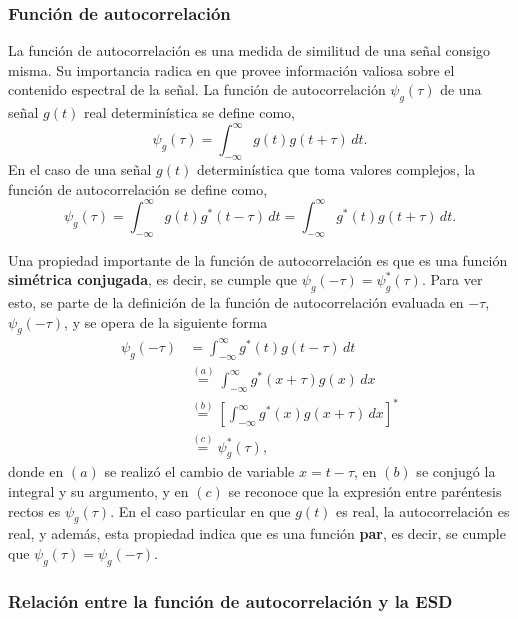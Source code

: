 \documentclass[a4paper]{article}
\begin{document}
\subsubsection{Función de autocorrelación}\label{sec:energy_signal_autocorr}

La función de autocorrelación es una medida de similitud de una señal consigo misma. Su importancia radica en que provee información valiosa sobre el contenido espectral de la señal. La función de autocorrelación \(\psi_g(\tau)\) de una señal \(g(t)\) real determinística se define como,
\begin{equation}\label{eq:deterministic_autocorr_def}
 \psi_g(\tau)=\int_{-\infty}^{\infty}g(t)g(t+\tau)\,dt.
\end{equation}
En el caso de una señal \(g(t)\) determinística que toma valores complejos, la función de autocorrelación se define como,
\[
 \psi_g(\tau)=\int_{-\infty}^{\infty}g(t)g^*(t-\tau)\,dt = \int_{-\infty}^{\infty}g^*(t)g(t+\tau)\,dt.
\]

Una propiedad importante de la función de autocorrelación es que es una función \textbf{simétrica conjugada}, es decir, se cumple que \(\psi_g(-\tau)=\psi_g^*(\tau)\). Para ver esto, se parte de la definición de la función de autocorrelación evaluada en \(-\tau\), \(\psi_g(-\tau)\), y se opera de la siguiente forma
\begin{align*}
 \psi_g(-\tau) &= \int_{-\infty}^{\infty}g^*(t)g(t-\tau)\,dt\\
  &\overset{(a)}{=}\int_{-\infty}^{\infty}g^*(x+\tau)g(x)\,dx\\
  &\overset{(b)}{=}\left[\int_{-\infty}^{\infty}g^*(x)g(x+\tau)\,dx\right]^*\\
  &\overset{(c)}{=}\psi_g^*(\tau),
\end{align*}
donde en \((a)\) se realizó el cambio de variable \(x=t-\tau\), en \((b)\) se conjugó la integral y su argumento, y en \((c)\) se reconoce que la expresión entre paréntesis rectos es \(\psi_g(\tau)\). En el caso particular en que \(g(t)\) es real, la autocorrelación es real, y además, esta propiedad indica que es una función \textbf{par}, es decir, se cumple que \(\psi_g(\tau)=\psi_g(-\tau)\).

\subsubsection{Relación entre la función de autocorrelación y la ESD}\label{sec:autocorr_and_esd_relation}
\end{document}
